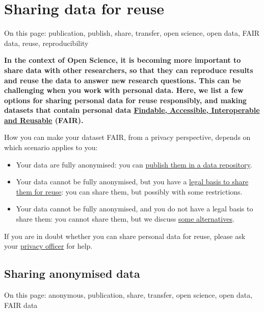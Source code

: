 \documentclass[
]{book}
\providecommand{\tightlist}{%
  \setlength{\itemsep}{0pt}\setlength{\parskip}{0pt}}
\begin{document}
\hypertarget{data-sharing-reuse}{%
\chapter{Sharing data for reuse}\label{data-sharing-reuse}}

On this page: publication, publish, share, transfer, open science, open data,
FAIR data, reuse, reproducibility

\textbf{In the context of Open Science, it is becoming more important to share data with
other researchers, so that they can reproduce results and reuse the data to
answer new research questions. This can be challenging when you work with
personal data. Here, we list a few options for sharing personal data for reuse
responsibly, and making datasets that contain personal data
\href{https://www.uu.nl/en/research/research-data-management/guides/how-to-make-your-data-fair}{Findable, Accessible, Interoperable and Reusable}
(FAIR).}

How you can make your dataset FAIR, from a privacy perspective, depends on
which scenario applies to you:

\begin{itemize}
\tightlist
\item
  Your data are fully anonymised: you can
  \protect\hyperlink{publish-anonymous-data}{publish them in a data repository}.
\item
  Your data cannot be fully anonymised, but you have a
  \protect\hyperlink{share-reuse-legal-basis}{legal basis to share them for reuse}: you can share
  them, but possibly with some restrictions.
\item
  Your data cannot be fully anonymised, and you do not have a legal basis to
  share them: you cannot share them, but we discuss
  \protect\hyperlink{sharing-reuse-alternatives}{some alternatives}.
\end{itemize}

If you are in doubt whether you can share personal data for reuse, please ask
your \protect\hyperlink{support}{privacy officer} for help.

\hypertarget{publish-anonymous-data}{%
\section{Sharing anonymised data}\label{publish-anonymous-data}}

On this page: anonymous, publication, share, transfer, open science, open data,
FAIR data
\end{document}
